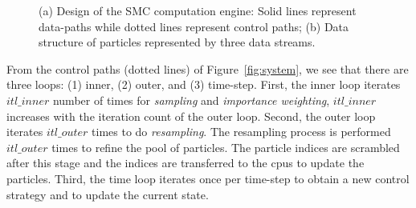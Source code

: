 \setcounter{subfigure}{0}
\begin{figure}[t!]
\centering
{}
\caption{(a) Design of the SMC computation engine: Solid lines represent data-paths while dotted lines represent control paths; (b) Data structure of particles represented by three data streams.}
\end{figure}

From the control paths (dotted lines) of Figure~\ref{fig:system}, we see that there are three loops: 
(1) inner, (2) outer, and (3) time-step.
First, the inner loop iterates $itl\_inner$ number of times for \textit{sampling} and \textit{importance weighting},
$itl\_inner$ increases with the iteration count of the outer loop.
Second, the outer loop iterates $itl\_outer$ times to do \textit{resampling}.
The resampling process is performed $itl\_outer$ times to refine the pool of particles.
The particle indices are scrambled after this stage and the indices are transferred to the \glspl{cpu} to update the particles.
Third, the time loop iterates once per time-step to obtain a new control strategy and to update the current state.

